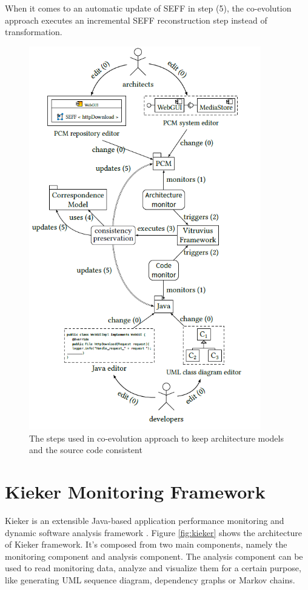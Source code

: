 When it comes to an automatic update of SEFF in step (5), the co-evolution approach executes an incremental SEFF reconstruction step instead of transformation. \\


\begin{figure}[h]
\centering
\includegraphics[width=0.9\textwidth]{figures/coevolution_approach}
\caption{The steps used in co-evolution approach to keep architecture models and the source code consistent}
\label{fig:coevoloution approach}
\end{figure}


\section{Kieker Monitoring Framework}
\label{sec:Kieker Monitoring}
Kieker is an extensible Java-based application performance monitoring and dynamic software analysis framework \cite{van2009continuous}. Figure \ref{fig:kieker} shows the architecture of Kieker framework. It's composed from two main components, namely the monitoring component and analysis component.   The analysis component can be used to read monitoring data, analyze and visualize them for a certain purpose, like generating UML sequence diagram, dependency graphs or Markov chains.\\

